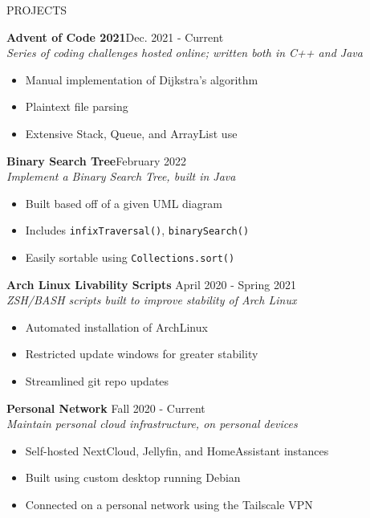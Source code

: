 \documentclass[UTF-8]{resume} \usepackage{multirow}
\begin{document}
\begin{rSection}{PROJECTS}
	\vspace{-1.5em}
\item \textbf{Advent of Code 2021}\hfill {Dec. 2021 - Current}\\
	\emph{Series of coding challenges hosted online; written both in C++ and Java}
	\begin{itemize}
          \itemsep -6pt {}
	       \item Manual implementation of Dijkstra's algorithm
	       \item Plaintext file parsing
           \item Extensive Stack, Queue, and ArrayList use
	\end{itemize}
\item \textbf{Binary Search Tree}\hfill {February 2022} \\
    \emph{ Implement a Binary Search Tree, built in Java}
	\begin{itemize}
         \itemsep -6pt {}
	      \item Built based off of a given UML diagram
          \item Includes \verb|infixTraversal()|, \verb|binarySearch()|
          \item Easily sortable using \verb|Collections.sort()|
	\end{itemize}
\item \textbf{Arch Linux Livability Scripts} \hfill {April 2020 - Spring 2021}\\
	\emph{ZSH/BASH scripts built to improve stability of Arch Linux}
	\begin{itemize}
	    \itemsep -6pt {}
             \item Automated installation of ArchLinux
             \item Restricted update windows for greater stability
             \item Streamlined git repo updates
	\end{itemize}
\item \textbf{Personal Network} \hfill{Fall 2020 - Current}\\
	\emph{Maintain personal cloud infrastructure, on personal devices}
       \begin{itemize}
           \itemsep -6pt {}
	        \item Self-hosted NextCloud, Jellyfin, and HomeAssistant instances
		    \item Built using custom desktop running Debian
            \item Connected on a personal network using the Tailscale VPN
	\end{itemize}
\end{rSection}
\end{document}

